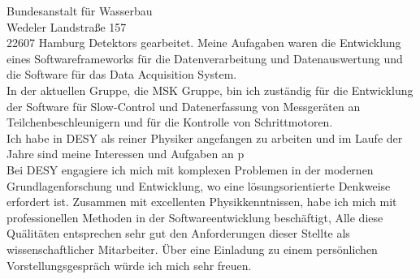 \documentclass[ebner,paper=a4,fontsize=11pt,ngerman,BCOR=10mm]{scrlttr2}%
\begin{document}
\begin{letter}{Bundesanstalt f\"ur Wasserbau\\
Wedeler Landstra{\ss}e 157\\ 
22607 Hamburg}
Detektors gearbeitet. Meine Aufagaben waren die Entwicklung eines
Softwareframeworks für die Datenverarbeitung und Datenauswertung und die
Software f{\"u}r das Data Acquisition System.\\
In der aktuellen Gruppe, die MSK Gruppe, bin ich zust{\"a}ndig f{\"u}r die
Entwicklung der Software f{\"u}r Slow-Control und Datenerfassung von
Messger{\"a}ten an Teilchenbeschleunigern und f{\"u}r die Kontrolle von
Schrittmotoren.\\
\indent Ich habe in DESY als reiner Physiker angefangen zu arbeiten und im Laufe
der Jahre sind meine Interessen und Aufgaben an p\\
Bei DESY engagiere ich mich mit komplexen Problemen in der modernen
Grundlagenforschung und Entwicklung, wo eine l{\"o}sungsorientierte Denkweise
erfordert ist. Zusammen mit excellenten Physikkenntnissen, habe ich mich mit
professionellen Methoden in der Softwareentwicklung besch\"aftigt,
Alle diese Qu{\"a}lit{\"a}ten entsprechen sehr gut den Anforderungen dieser
Stellte als wissenschaftlicher Mitarbeiter. \"Uber eine Einladung zu einem pers\"onlichen
Vorstellungsgespr\"ach w\"urde ich mich sehr freuen.


\end{letter}
\end{document}
